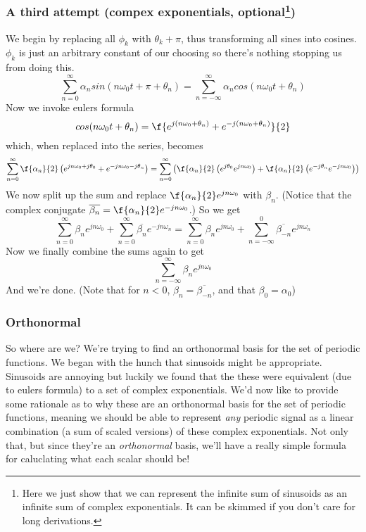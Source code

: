 \documentclass{article}
\newcommand{\0}{{\mathbf{0}}}
\begin{document}
\subsubsection{A third attempt (compex exponentials, optional\footnote{Here we just show that we can represent the infinite sum of sinusoids as an infinite sum of complex exponentials.
It can be skimmed if you don't care for long derivations.})}
We begin by replacing all $\phi_k$ with $\theta_k + \pi$, thus transforming all sines into cosines. $\phi_k$ is just an arbitrary constant of our choosing so there's nothing stopping us from doing this.
$$ \sum^{\infty}_{n = 0} \alpha_n sin(n \omega_0 t + \pi + \theta_n) = \sum^{\infty}_{n = -\infty} \alpha_n cos(n \omega_0 t + \theta_n)  $$
Now we invoke eulers formula
$$ cos(n\omega_0 t + \theta_n) = \f{e^{j(n\omega_0+\theta_n)} + e^{-j(n\omega_0 + \theta_n)}}{2} $$
which, when replaced into the series, becomes
$$ \sum^{\infty}_{n = 0} \f{\alpha_n}{2}\left( e^{jn\omega_0 + j\theta_0} + e^{-jn\omega_0 - j\theta_n} \right) = \sum^{\infty}_{n = 0} \left( \f{\alpha_n}{2}\left( e^{j\theta_0} e^{jn\omega_0} \right) + \f{\alpha_n}{2} \left( e^{-j\theta_n} e^{-jn\omega_0} \right) \right) $$
We now split up the sum and replace $\f{\alpha_n}{2}e^{jn\omega_0}$ with $\beta_n$. (Notice that the complex conjugate $\overline{\beta_n} = \f{\alpha_n}{2}e^{-jn\omega_0}$.)
So we get
$$ \sum^{\infty}_{n = 0} \beta_n e^{jn\omega_0} + \sum^{\infty}_{n=0} \overline{\beta_n} e^{-jn\omega_n} = \sum^{\infty}_{n = 0} \beta_n e^{jn\omega_0} + \sum^{0}_{n=-\infty} \overline{\beta_{-n}} e^{jn\omega_n}$$
Now we finally combine the sums again to get
$$ \sum^{\infty}_{n = -\infty} \beta_n e^{jn\omega_0} $$
And we're done. (Note that for $n<0$, $\beta_n = \overline{\beta_{-n}}$, and that $\beta_0 = \alpha_0$)

\subsubsection{Orthonormal}
So where are we? We're trying to find an orthonormal basis
for the set of periodic functions. We began with the hunch that
sinusoids might be appropriate. Sinusoids are annoying but luckily
we found that the these were equivalent (due to eulers formula) to
a set of complex exponentials. We'd now like to provide some rationale
as to why these are an orthonormal basis for the set of periodic functions,
meaning we should be able to represent \textit{any} periodic signal
as a linear combination (a sum of scaled versions) of these complex exponentials.
Not only that, but since they're an \textit{orthonormal} basis,
we'll have a really simple formula for caluclating what each scalar should be!
\end{document}
